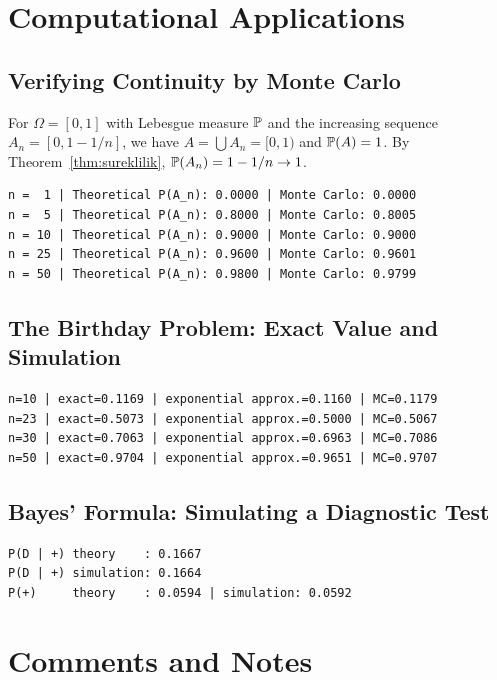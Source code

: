 \documentclass[main.tex]{subfiles}
\begin{document}
\section{Computational Applications}

\subsection{Verifying Continuity by Monte Carlo}
For $\Omega=[0,1]$ with Lebesgue measure $\P$ and the increasing sequence $A_n=[0,1-1/n]$, we have $A=\bigcup A_n=[0,1)$ and $\P(A)=1$. By Theorem~\ref{thm:sureklilik}, $\P(A_n)=1-1/n\to 1$.

\begin{lstlisting}[style=output]
n =  1 | Theoretical P(A_n): 0.0000 | Monte Carlo: 0.0000
n =  5 | Theoretical P(A_n): 0.8000 | Monte Carlo: 0.8005
n = 10 | Theoretical P(A_n): 0.9000 | Monte Carlo: 0.9000
n = 25 | Theoretical P(A_n): 0.9600 | Monte Carlo: 0.9601
n = 50 | Theoretical P(A_n): 0.9800 | Monte Carlo: 0.9799
\end{lstlisting}

\subsection{The Birthday Problem: Exact Value and Simulation}

\begin{lstlisting}[style=output]
n=10 | exact=0.1169 | exponential approx.=0.1160 | MC=0.1179
n=23 | exact=0.5073 | exponential approx.=0.5000 | MC=0.5067
n=30 | exact=0.7063 | exponential approx.=0.6963 | MC=0.7086
n=50 | exact=0.9704 | exponential approx.=0.9651 | MC=0.9707
\end{lstlisting}

\subsection{Bayes' Formula: Simulating a Diagnostic Test}

\begin{lstlisting}[style=output]
P(D | +) theory    : 0.1667
P(D | +) simulation: 0.1664
P(+)     theory    : 0.0594 | simulation: 0.0592
\end{lstlisting}

\section{Comments and Notes}
\end{document}
